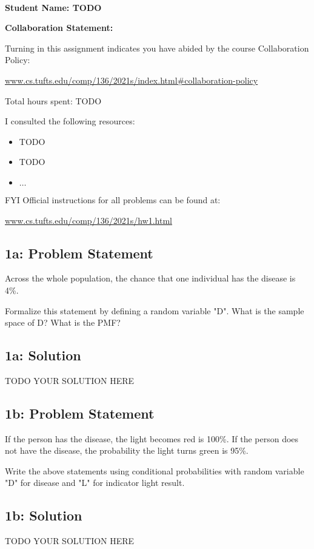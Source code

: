 \documentclass[12pt]{article}
\newcommand{\officialdirections}[1]{{\color{blue} #1}}
\begin{document}
~~\\ %

{\Large{\bf Student Name: TODO}}

{\Large{\bf Collaboration Statement:}}

Turning in this assignment indicates you have abided by the course Collaboration Policy:

\url{www.cs.tufts.edu/comp/136/2021s/index.html#collaboration-policy}

Total hours spent: TODO

I consulted the following resources:
\begin{itemize}
\item TODO
\item TODO
\item $\ldots$	
\end{itemize}

FYI Official instructions for all problems can be found at:

\url{www.cs.tufts.edu/comp/136/2021s/hw1.html}

\tableofcontents

\newpage
\officialdirections{
\subsection*{1a: Problem Statement}

Across the whole population, the chance that one individual has the disease is 4\%. 

Formalize this statement by defining a random variable "D". What is the sample space of D? What is the PMF?
}

\subsection{1a: Solution}
TODO YOUR SOLUTION HERE

\officialdirections{
\subsection*{1b: Problem Statement}

If the person has the disease, the light becomes red is 100\%.
If the person does not have the disease, the probability the light turns green is 95\%.

Write the above statements using conditional probabilities with random variable "D" for disease and "L" for indicator light result. 
}

\subsection{1b: Solution}
TODO YOUR SOLUTION HERE
\end{document}
